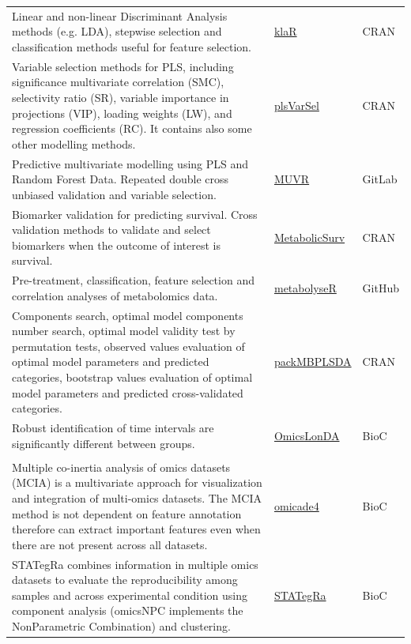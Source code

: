 \documentclass[]{article}
\begin{document}
\begin{longtable}[t]{>{\raggedright\arraybackslash}p{30em}>{\raggedright\arraybackslash}p{10em}>{\raggedright\arraybackslash}p{3em}}
Linear and non-linear Discriminant Analysis methods (e.g. LDA), stepwise selection and classification methods useful for feature selection. & \href{https://cran.r-project.org/package=klaR}{klaR} & CRAN\\
\rowcolor{gray!6}  Variable selection methods for PLS, including significance multivariate correlation (SMC), selectivity ratio (SR), variable importance in projections (VIP), loading weights (LW), and regression coefficients (RC). It contains also some other modelling methods. & \href{https://cran.r-project.org/package=plsVarSel}{plsVarSel} & CRAN\\
Predictive multivariate modelling using PLS and Random Forest Data. Repeated double cross unbiased validation and variable selection. & \href{https://gitlab.com/CarlBrunius/MUVR}{MUVR} & GitLab\\
\rowcolor{gray!6}  Biomarker validation for predicting survival. Cross validation methods to validate and select biomarkers when the outcome of interest is survival. & \href{https://cran.r-project.org/package=MetabolicSurv}{MetabolicSurv} & CRAN\\
Pre-treatment, classification, feature selection and correlation analyses of metabolomics data. & \href{https://github.com/jasenfinch/metabolyseR}{metabolyseR} & GitHub\\
\rowcolor{gray!6}  Components search, optimal model components number search, optimal model validity test by permutation tests, observed values evaluation of optimal model parameters and predicted categories, bootstrap values evaluation of optimal model parameters and predicted cross-validated categories. & \href{https://cran.r-project.org/package=packMBPLSDA}{packMBPLSDA} & CRAN\\
Robust identification of time intervals are significantly different between groups. & \href{https://doi.org/doi:10.18129/B9.bioc.OmicsLonDA}{OmicsLonDA} & BioC\\
\rowcolor{gray!6}  \addlinespace[0.3em]
\multicolumn{3}{l}{\textbf{Omics Data integration}}\\
Multiple co-inertia analysis of omics datasets (MCIA) is a multivariate approach for visualization and integration of multi-omics datasets. The MCIA method is not dependent on feature annotation therefore can extract important features even when there are not present across all datasets. & \href{http://bioconductor.org/packages/release/bioc/html/omicade4.html}{omicade4} & BioC\\
STATegRa combines information in multiple omics datasets to evaluate the reproducibility among samples and across experimental condition using component analysis (omicsNPC implements the NonParametric Combination) and clustering. & \href{https://doi.org/doi:10.18129/B9.bioc.STATegRa}{STATegRa} & BioC\\

\end{longtable}
\end{document}
